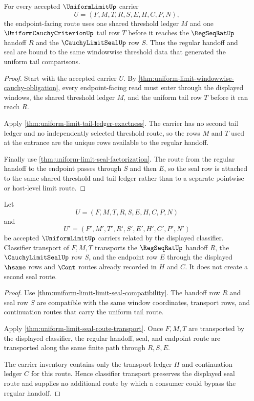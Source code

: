 \begin{theorem}
\label{thm:uniform-limit-shared-threshold-regular-seal}
For every accepted $\UniformLimitUp$ carrier
$$
U=(F,M,T,R,S,E,H,C,P,N),
$$
the endpoint-facing route uses one shared threshold ledger $M$ and one $\UniformCauchyCriterionUp$ tail row $T$ before it reaches the $\RegSeqRatUp$ handoff $R$ and the $\CauchyLimitSealUp$ row $S$. Thus the regular handoff and seal are bound to the same windowwise threshold data that generated the uniform tail comparisons.
\end{theorem}
\begin{proof}
Start with the accepted carrier $U$. By \autoref{thm:uniform-limit-windowwise-cauchy-obligation}, every endpoint-facing read must enter through the displayed windows, the shared threshold ledger $M$, and the uniform tail row $T$ before it can reach $R$.

Apply \autoref{thm:uniform-limit-tail-ledger-exactness}. The carrier has no second tail ledger and no independently selected threshold route, so the rows $M$ and $T$ used at the entrance are the unique rows available to the regular handoff.

Finally use \autoref{thm:uniform-limit-seal-factorization}. The route from the regular handoff to the endpoint passes through $S$ and then $E$, so the seal row is attached to the same shared threshold and tail ledger rather than to a separate pointwise or host-level limit route.
\end{proof}

\begin{theorem}
\label{thm:uniform-limit-regseq-seal-classifier-scope}
Let
$$
U=(F,M,T,R,S,E,H,C,P,N)
$$
and
$$
U'=(F',M',T',R',S',E',H',C',P',N')
$$
be accepted $\UniformLimitUp$ carriers related by the displayed classifier. Classifier transport of $F,M,T$ transports the $\RegSeqRatUp$ handoff $R$, the $\CauchyLimitSealUp$ row $S$, and the endpoint row $E$ through the displayed $\hsame$ rows and $\Cont$ routes already recorded in $H$ and $C$. It does not create a second seal route.
\end{theorem}
\begin{proof}
Use \autoref{thm:uniform-limit-limit-seal-compatibility}. The handoff row $R$ and seal row $S$ are compatible with the same window coordinates, transport rows, and continuation routes that carry the uniform tail route.

Apply \autoref{thm:uniform-limit-seal-route-transport}. Once $F,M,T$ are transported by the displayed classifier, the regular handoff, seal, and endpoint route are transported along the same finite path through $R,S,E$.

The carrier inventory contains only the transport ledger $H$ and continuation ledger $C$ for this route. Hence classifier transport preserves the displayed seal route and supplies no additional route by which a consumer could bypass the regular handoff.
\end{proof}

